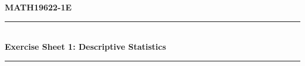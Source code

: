 \documentclass[11pt, a4paper]{article}
\begin{document}
\begin{center}
    \textbf{\large MATH19622-1E} \\
    \vspace{0.2cm}
    \rule{0.8\textwidth}{0.4pt} \\
    \vspace{0.4cm}
    \textbf{\Large Exercise Sheet 1: Descriptive Statistics} \\
    \vspace{0.4cm}
    \rule{0.8\textwidth}{0.4pt} \\
\end{center}
\vspace{0.6cm}


\end{document}

